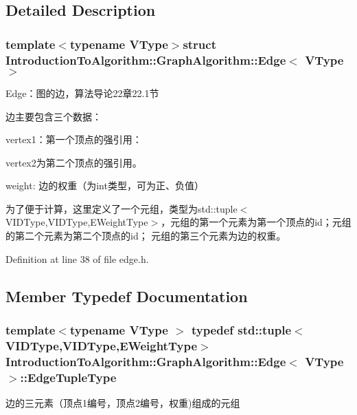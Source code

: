 \subsection{Detailed Description}
\subsubsection*{template$<$typename V\+Type$>$struct Introduction\+To\+Algorithm\+::\+Graph\+Algorithm\+::\+Edge$<$ V\+Type $>$}

Edge：图的边，算法导论22章22.1节 

边主要包含三个数据：


\begin{DoxyItemize}
\item {\ttfamily vertex1}：第一个顶点的强引用：
\item {\ttfamily vertex2}为第二个顶点的强引用。
\item {\ttfamily weight}\+: 边的权重（为int类型，可为正、负值）
\end{DoxyItemize}

为了便于计算，这里定义了一个元组，类型为{\ttfamily std\+::tuple$<$V\+I\+D\+Type,V\+I\+D\+Type,E\+Weight\+Type$>$}，元组的第一个元素为第一个顶点的{\ttfamily id}；元组的第二个元素为第二个顶点的{\ttfamily id}； 元组的第三个元素为边的权重。 

Definition at line 38 of file edge.\+h.



\subsection{Member Typedef Documentation}
\hypertarget{struct_introduction_to_algorithm_1_1_graph_algorithm_1_1_edge_a6cc12c05f7645ce74a6cff13b9ea932c}{}
\subsubsection[{Edge\+Tuple\+Type}]{\setlength{\rightskip}{0pt plus 5cm}template$<$typename V\+Type $>$ typedef std\+::tuple$<${\bf V\+I\+D\+Type},{\bf V\+I\+D\+Type},{\bf E\+Weight\+Type}$>$ {\bf Introduction\+To\+Algorithm\+::\+Graph\+Algorithm\+::\+Edge}$<$ V\+Type $>$\+::{\bf Edge\+Tuple\+Type}}\label{struct_introduction_to_algorithm_1_1_graph_algorithm_1_1_edge_a6cc12c05f7645ce74a6cff13b9ea932c}
边的三元素（顶点1编号，顶点2编号，权重)组成的元组 

